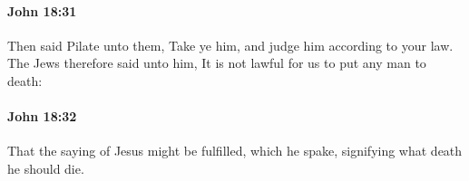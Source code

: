		\paragraph{John 18:31} %
			\label{JOHN-18-31}

			Then said Pilate unto them, Take ye him, and judge him according to your law. The Jews therefore said unto him, It is not lawful for us to put any man to death:

			\begin{framed}
				\scriptsize
				\begin{compactdesc}
					\item[SBLG] 
				\end{compactdesc}
			\end{framed}

		\paragraph{John 18:32} %
			\label{JOHN-18-32}

			That the saying of Jesus might be fulfilled, which he spake, signifying what death he should die.

